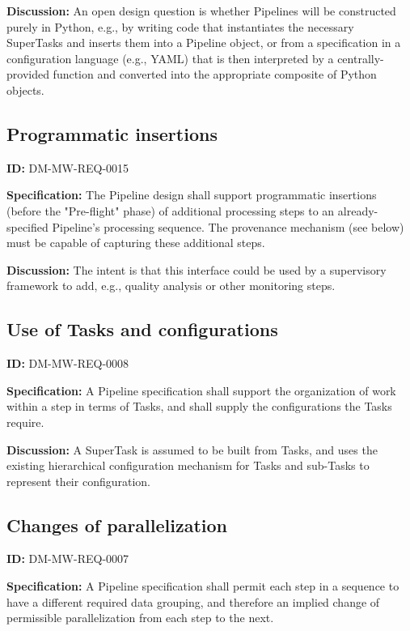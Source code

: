\documentclass[SE,toc,lsstdraft]{lsstdoc}
\begin{document}
\textbf{Discussion:}
An open design question is whether Pipelines will be constructed purely in Python, e.g., by writing code that instantiates the necessary SuperTasks and inserts them into a Pipeline object, or from a specification in a configuration language (e.g., YAML) that is then interpreted by a centrally-provided function and converted into the appropriate composite of Python objects.

\subsection{Programmatic insertions}

\label{DM-MW-REQ-0015}
\textbf{ID:} DM-MW-REQ-0015

\textbf{Specification:}
The Pipeline design shall support programmatic insertions (before the "Pre-flight" phase) of additional processing steps to an already-specified Pipeline’s processing sequence. The provenance mechanism (see below) must be capable of capturing these additional steps.

\textbf{Discussion:}
The intent is that this interface could be used by a supervisory framework to add, e.g., quality analysis or other monitoring steps.

\subsection{Use of Tasks and configurations}

\label{DM-MW-REQ-0008}
\textbf{ID:} DM-MW-REQ-0008

\textbf{Specification:}
A Pipeline specification shall support the organization of work within a step in terms of Tasks, and shall supply the configurations the Tasks require.

\textbf{Discussion:}
A SuperTask is assumed to be built from Tasks, and uses the existing hierarchical configuration mechanism for Tasks and sub-Tasks to represent their configuration.

\subsection{Changes of parallelization}

\label{DM-MW-REQ-0007}
\textbf{ID:} DM-MW-REQ-0007

\textbf{Specification:}
A Pipeline specification shall permit each step in a sequence to have a different required data grouping, and therefore an implied change of permissible parallelization from each step to the next.
\end{document}
